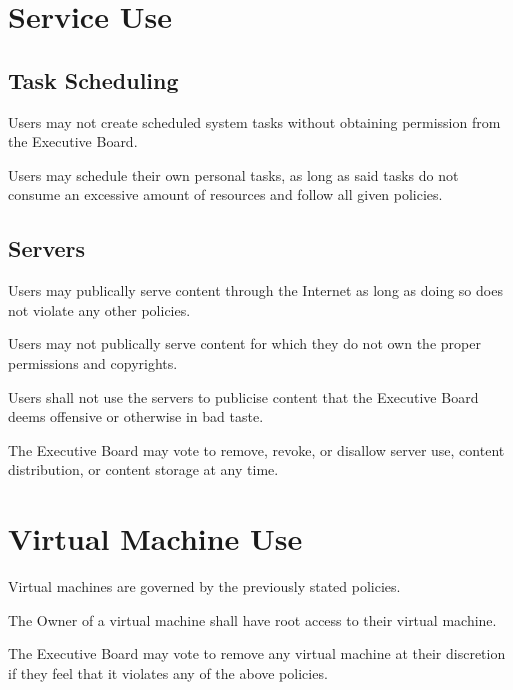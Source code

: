 \section{Service Use}

\subsection{Task Scheduling}
\begin{subroutines}
\item Users may not create scheduled system tasks without obtaining permission from the Executive Board.
\item Users may schedule their own personal tasks, as long as said tasks do not consume an excessive amount of resources and follow all given policies.
\end{subroutines}

\subsection{Servers}
\begin{subroutines}
\item Users may publically serve content through the Internet as long as doing so does not violate any other policies.
\item Users may not publically serve content for which they do not own the proper permissions and copyrights.
\item Users shall not use the servers to publicise content that the Executive Board deems offensive or otherwise in bad taste.
\item The Executive Board may vote to remove, revoke, or disallow server use, content distribution, or content storage at any time.
\end{subroutines}

\section{Virtual Machine Use}
\begin{subroutines}
\item Virtual machines are governed by the previously stated policies.
\item The Owner of a virtual machine shall have root access to their virtual machine.
\item The Executive Board may vote to remove any virtual machine at their discretion if they feel that it violates any of the above policies.
\end{subroutines}

